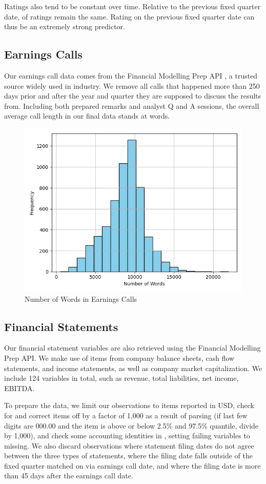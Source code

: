 \documentclass{article}[11pt]
\begin{document}
    Ratings also tend to be constant over time. Relative to the previous fixed quarter date, \shareNotChanges \space of ratings remain the same. Rating on the previous fixed quarter date can thus be an extremely strong predictor.

    \subsection*{Earnings Calls}

    Our earnings call data comes from the Financial Modelling Prep API \citep{financial_modeling_prep_financial_2024}, a trusted source widely used in industry. We remove all calls that happened more than 250 days prior and after the year and quarter they are supposed to discuss the results from. Including both prepared remarks and analyst Q and A sessions, the overall average call length in our final data stands at \avgCallLength \space words.

    \begin{figure}[h!]
		\centering
        \caption{Number of Words in Earnings Calls}
        \includegraphics[width=0.6\linewidth,keepaspectratio=true]{../Output/All Data EDA/NLP EDA/all_data_num_words_distribution_no_title.png}
	\end{figure}

    \subsection*{Financial Statements}

    Our financial statement variables are also retrieved using the Financial Modelling Prep API. We make use of items from company balance sheets, cash flow statements, and income statements, as well as company market capitalization. We include 124 variables in total, such as revenue, total liabilities, net income, EBITDA.
    
    To prepare the data, we limit our observations to items reported in USD, check for and correct items off by a factor of 1,000 as a result of parsing (if last few digits are 000.00 and the item is above or below 2.5\% and 97.5\% quantile, divide by 1,000), and check some accounting identities in \cite{das_credit_2023}, setting failing variables to missing. We also discard observations where statement filing dates do not agree between the three types of statements, where the filing date falls outside of the fixed quarter matched on via earnings call date, and where the filing date is more than 45 days after the earnings call date.
\end{document}

